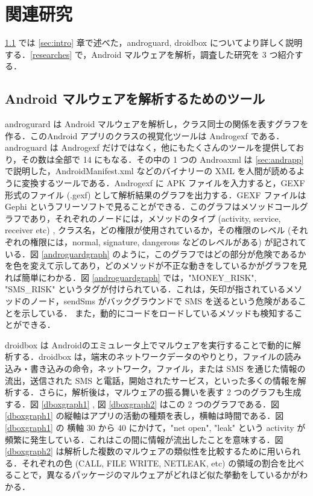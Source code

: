 \section{関連研究}
\ref{tools} では \ref{sec:intro} 章で述べた，androguard, droidbox についてより詳しく説明する．\ref{researches} で，Android マルウェアを解析，調査した研究を 3 つ紹介する．
\subsection{Android マルウェアを解析するためのツール}
\label{tools}
androgurard \cite{aguard} は Android マルウェアを解析し，クラス同士の関係を表すグラフを作る．このAndroid アプリのクラスの視覚化ツールは Androgexf である．androguard  は Androgexf だけではなく，他にもたくさんのツールを提供しており，その数は全部で 14 にもなる．その中の 1 つの Androaxml は \ref{sec:andrapp} で説明した，AndroidManifest.xml などのバイナリーの XML を人間が読めるように変換するツールである．Androgexf  に APK ファイルを入力すると，GEXF 形式のファイル (.gexf) として解析結果のグラフを出力する．GEXF ファイルは Gephi というフリーソフトで見ることができる．このグラフはメソッドコールグラフであり，それぞれのノードには，メソッドのタイプ (activity, service, receiver etc) , クラス名，どの権限が使用されているか，その権限のレベル (それぞれの権限には，normal, signature, dangerous などのレベルがある) が記されている．図 \ref{androguardgraph} のように，このグラフではどの部分が危険であるかを色を変えて示してあり，どのメソッドが不正な動きをしているかがグラフを見れば簡単にわかる．図 \ref{androguardgraph} では，"MONEY\_RISK", "SMS\_RISK" というタグが付けられている．これは，矢印が指されているメソッドのノード，sendSms がバックグラウンドで SMS を送るという危険があることを示している． また，動的にコードをロードしているメソッドも検知することができる．

droidbox \cite{dbox} は Androidのエミュレータ上でマルウェアを実行することで動的に解析する．droidbox  は，端末のネットワークデータのやりとり，ファイルの読み込み・書き込みの命令，ネットワーク，ファイル，または SMS を通じた情報の流出，送信された SMS と電話，開始されたサービス，といった多くの情報を解析する．さらに，解析後は，マルウェアの振る舞いを表す 2 つのグラフも生成する．図 \ref{dboxgraph1} , 図 \ref{dboxgraph2} はこの 2 つのグラフである．図 \ref{dboxgraph1} の縦軸はアプリの活動の種類を表し，横軸は時間である．図 \ref{dboxgraph1} の 横軸  30 から 40 にかけて，"net open", "leak" という activity が頻繁に発生している．これはこの間に情報が流出したことを意味する．図 \ref{dboxgraph2} は解析した複数のマルウェアの類似性を比較するために用いられる．それぞれの色 (CALL, FILE WRITE, NETLEAK, etc) の領域の割合を比べることで，異なるパッケージのマルウェアがどれほど似た挙動をしているかがわかる．

